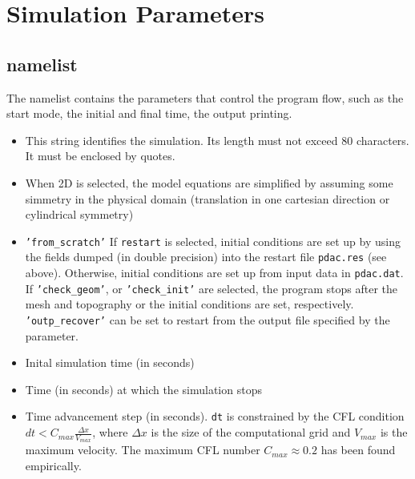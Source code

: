 \section{Simulation Parameters}
\label{section:input_par}

\subsection{ namelist}
The  namelist contains the parameters that control the program
flow, such as the start mode, the initial and final time, the output printing.

\begin{itemize}
\item
{}
{This string identifies the simulation. Its length must not exceed 80 characters. It must be enclosed by quotes.}

\item
{}
{When 2D is selected, the model equations are simplified by assuming
some simmetry in the physical domain (translation in one cartesian 
direction or cylindrical symmetry)}

\item
{}
{{\tt 'from\_scratch'}}
{If {\tt restart} is selected, initial conditions are set up by using the fields
dumped (in double precision) into the restart file {\tt pdac.res} (see above). 
Otherwise, initial conditions are set up from input data in {\tt pdac.dat}.
If {\tt 'check\_geom'}, or {\tt 'check\_init'} are selected, the program stops
after the mesh and topography or the initial conditions are set, respectively.
{\tt 'outp\_recover'} can be set to restart from the output file specified
by the  parameter.} 

\item
{}
{Inital simulation time (in seconds)}

\item
{}
{Time (in seconds) at which the simulation stops}

\item
{}
{Time advancement step (in seconds). 
{\tt dt} is constrained by the CFL condition
$dt < C_{max}\frac{\Delta x}{V_{max}}$, where $\Delta x$ is
the size of the computational grid and $V_{max}$ is the maximum
velocity. The maximum CFL number $C_{max}\approx 0.2$ has been 
found empirically.}


\end{itemize}
